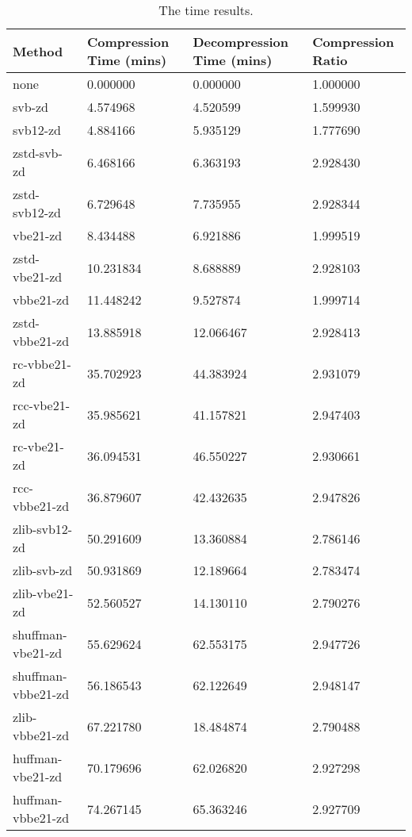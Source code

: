 \begin{table}
    \caption{\label{tab:results-time-com} The time results.}
	\begin{tabular}{|l|l|l|l|}
	    \hline
	    Method & Compression Time (mins) & Decompression Time (mins) & Compression Ratio \\
\hline
                none   &    0.000000    &     0.000000  & 1.000000\\
              svb-zd   &    4.574968    &     4.520599  & 1.599930\\
            svb12-zd   &    4.884166    &     5.935129  & 1.777690\\
         zstd-svb-zd   &    6.468166    &     6.363193  & 2.928430\\
       zstd-svb12-zd   &    6.729648    &     7.735955  & 2.928344\\
            vbe21-zd   &    8.434488    &     6.921886  & 1.999519\\
       zstd-vbe21-zd   &   10.231834    &     8.688889  & 2.928103\\
           vbbe21-zd   &   11.448242    &     9.527874  & 1.999714\\
      zstd-vbbe21-zd   &   13.885918    &    12.066467  & 2.928413\\
        rc-vbbe21-zd   &   35.702923    &    44.383924  & 2.931079\\
        rcc-vbe21-zd   &   35.985621    &    41.157821  & 2.947403\\
         rc-vbe21-zd   &   36.094531    &    46.550227  & 2.930661\\
       rcc-vbbe21-zd   &   36.879607    &    42.432635  & 2.947826\\
       zlib-svb12-zd   &   50.291609    &    13.360884  & 2.786146\\
         zlib-svb-zd   &   50.931869    &    12.189664  & 2.783474\\
       zlib-vbe21-zd   &   52.560527    &    14.130110  & 2.790276\\
   shuffman-vbe21-zd   &   55.629624    &    62.553175  & 2.947726\\
  shuffman-vbbe21-zd   &   56.186543    &    62.122649  & 2.948147\\
      zlib-vbbe21-zd   &   67.221780    &    18.484874  & 2.790488\\
    huffman-vbe21-zd   &   70.179696    &    62.026820  & 2.927298\\
   huffman-vbbe21-zd   &   74.267145    &    65.363246  & 2.927709\\

\end{tabular}
\end{table}
